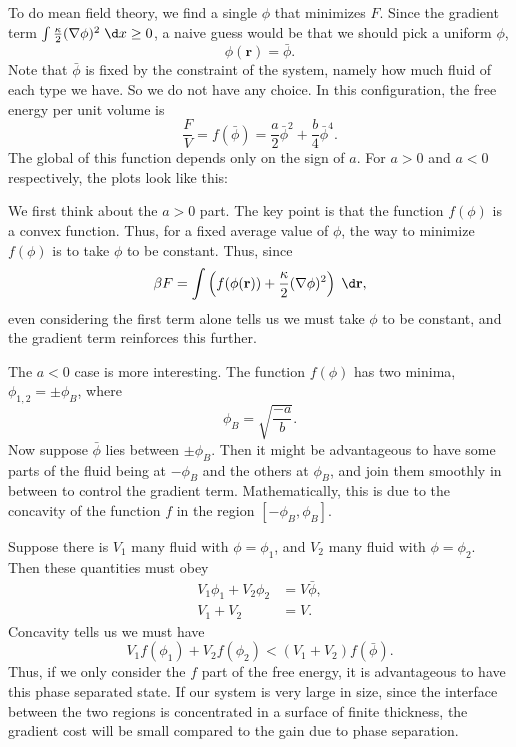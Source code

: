 \documentclass[a4paper]{article}
\begin{document}
To do mean field theory, we find a single $\phi$ that minimizes $F$. Since the gradient term $\int \frac{\kappa}{2} (\nabla \phi)^2\;\d x \geq 0$, a naive guess would be that we should pick a uniform $\phi$,
\[
  \phi(\mathbf{r}) = \bar{\phi}.
\]
Note that $\bar{\phi}$ is fixed by the constraint of the system, namely how much fluid of each type we have. So we do not have any choice. In this configuration, the free energy per unit volume is
\[
  \frac{F}{V} = f(\bar{\phi}) = \frac{a}{2} \bar{\phi}^2 + \frac{b}{4} \bar{\phi}^4.
\]
The global of this function depends only on the sign of $a$. For $a > 0$ and $a < 0$ respectively, the plots look like this:
\begin{center}
\end{center}
We first think about the $a > 0$ part. The key point is that the function $f(\phi)$ is a convex function. Thus, for a fixed average value of $\phi$, the way to minimize $f(\phi)$ is to take $\phi$ to be constant. Thus, since
\[
  \beta F = \int \left(f(\phi(\mathbf{r})) + \frac{\kappa}{2} (\nabla \phi)^2\right)\;\d \mathbf{r},
\]
even considering the first term alone tells us we must take $\phi$ to be constant, and the gradient term reinforces this further.

The $a < 0$ case is more interesting. The function $f(\phi)$ has two minima, $\phi_{1, 2} = \pm \phi_B$, where
\[
  \phi_B = \sqrt{\frac{-a}{b}}.
\]
Now suppose $\bar{\phi}$ lies between $\pm \phi_B$. Then it might be advantageous to have some parts of the fluid being at $-\phi_B$ and the others at $\phi_B$, and join them smoothly in between to control the gradient term. Mathematically, this is due to the concavity of the function $f$ in the region $[-\phi_B, \phi_B]$.

Suppose there is $V_1$ many fluid with $\phi = \phi_1$, and $V_2$ many fluid with $\phi = \phi_2$. Then these quantities must obey
\begin{align*}
  V_1 \phi_1 + V_2 \phi_2 &= V \bar{\phi},\\
  V_1 + V_2 &= V.
\end{align*}
Concavity tells us we must have
\[
  V_1 f(\phi_1) + V_2 f(\phi_2) < (V_1 + V_2) f(\bar{\phi}).
\]
Thus, if we only consider the $f$ part of the free energy, it is advantageous to have this phase separated state. If our system is very large in size, since the interface between the two regions is concentrated in a surface of finite thickness, the gradient cost will be small compared to the gain due to phase separation.
\end{document}
